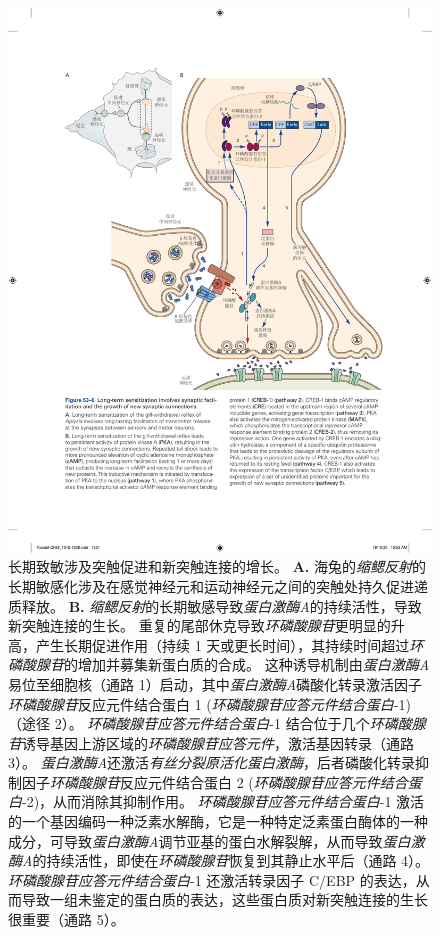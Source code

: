 \begin{figure}[htbp]
	\centering
	\includegraphics[width=1.0\linewidth]{chap53/fig_53_6}
	\caption{长期致敏涉及突触促进和新突触连接的增长。
		\textbf{A.} 海兔的\textit{缩鳃反射}的长期敏感化涉及在感觉神经元和运动神经元之间的突触处持久促进递质释放。
		\textbf{B.} \textit{缩鳃反射}的长期敏感导致\textit{蛋白激酶A}的持续活性，导致新突触连接的生长。
		重复的尾部休克导致\textit{环磷酸腺苷}更明显的升高，产生长期促进作用（持续 1 天或更长时间），其持续时间超过\textit{环磷酸腺苷}的增加并募集新蛋白质的合成。
		这种诱导机制由\textit{蛋白激酶A}易位至细胞核（通路 1）启动，其中\textit{蛋白激酶A}磷酸化转录激活因子\textit{环磷酸腺苷}反应元件结合蛋白 1 (\textit{环磷酸腺苷应答元件结合蛋白}-1)（途径 2）。
		\textit{环磷酸腺苷应答元件结合蛋白}-1 结合位于几个\textit{环磷酸腺苷}诱导基因上游区域的\textit{环磷酸腺苷应答元件}，激活基因转录（通路 3）。
		\textit{蛋白激酶A}还激活\textit{有丝分裂原活化蛋白激酶}，后者磷酸化转录抑制因子\textit{环磷酸腺苷}反应元件结合蛋白 2 (\textit{环磷酸腺苷应答元件结合蛋白}-2)，从而消除其抑制作用。
		\textit{环磷酸腺苷应答元件结合蛋白}-1 激活的一个基因编码一种泛素水解酶，它是一种特定泛素蛋白酶体的一种成分，可导致\textit{蛋白激酶A}调节亚基的蛋白水解裂解，从而导致\textit{蛋白激酶A}的持续活性，即使在\textit{环磷酸腺苷}恢复到其静止水平后（通路 4）。
		\textit{环磷酸腺苷应答元件结合蛋白}-1 还激活转录因子 C/EBP 的表达，从而导致一组未鉴定的蛋白质的表达，这些蛋白质对新突触连接的生长很重要（通路 5）。}
	\label{fig:53_6}
\end{figure}


